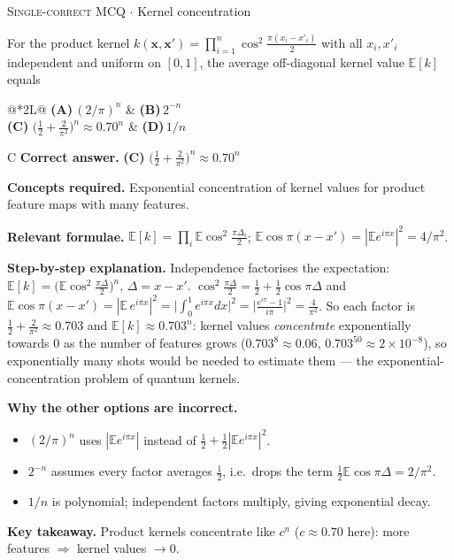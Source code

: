 \documentclass[11pt,a4paper]{article}
\newcommand{\optlabel}[1]{\textbf{(#1)}}
\newcommand{\correctlabel}[1]{\textcolor{okgreen}{\textbf{(#1)}\,\ding{51}}}
\newenvironment{qitem}[1]{\begin{list}{}{\setlength{\leftmargin}{3.3em}\setlength{\labelwidth}{3.1em}%
  \setlength{\labelsep}{0.2em}\setlength{\topsep}{3pt}\setlength{\parsep}{3pt}}\item[\textbf{Q.#1}\hfill]}{\end{list}}
\newcommand{\qsep}{\par\vspace{2pt}{\color{black!15}\hrule}\vspace{4pt}}
\newcommand{\qmeta}[2]{{\footnotesize\color{black!60}\textsc{#1} \;$\cdot$\; #2}\par}
\begin{document}
\begin{qitem}{70}
\qmeta{Single-correct MCQ}{Kernel concentration}
For the product kernel $k(\mathbf x, \mathbf x') = \prod_{i=1}^{n}\cos^2\frac{\pi(x_i - x'_i)}{2}$ with all $x_i, x'_i$ independent
and uniform on $[0, 1]$, the average off-diagonal kernel value $\mathbb E[k]$ equals
\par\smallskip\noindent\begin{tabularx}{\linewidth}{@{}*{2}{L}@{}}
\optlabel{A}\,$(2/\pi)^n$ & \optlabel{B}\,$2^{-n}$ \\[3pt]
\correctlabel{C}\,$\big(\tfrac12 + \tfrac{2}{\pi^2}\big)^n \approx 0.70^n$ & \optlabel{D}\,$1/n$
\end{tabularx}
\end{qitem}
\begin{solbox}{C}
\textbf{\color{brand}Correct answer.} \textcolor{okgreen}{\textbf{(C)}} $\big(\tfrac12 + \tfrac{2}{\pi^2}\big)^n \approx 0.70^n$

\textbf{\color{brand}Concepts required.} Exponential concentration of kernel values for product feature maps with many features.

\textbf{\color{brand}Relevant formulae.} $\mathbb E[k] = \prod_i\mathbb E\cos^2\frac{\pi\Delta_i}2$; $\mathbb E\cos\pi(x - x') = |\mathbb Ee^{i\pi x}|^2 = 4/\pi^2$.

\textbf{\color{brand}Step-by-step explanation.} Independence factorises the expectation: $\mathbb E[k] = \big(\mathbb E\cos^2\frac{\pi\Delta}{2}\big)^n$, $\Delta = x - x'$.
$\cos^2\frac{\pi\Delta}{2} = \frac12 + \frac12\cos\pi\Delta$ and $\mathbb E\cos\pi(x - x') = |\mathbb E\,e^{i\pi x}|^2 = \big|\int_0^1e^{i\pi x}dx\big|^2 = \big|\frac{e^{i\pi} - 1}{i\pi}\big|^2 = \frac{4}{\pi^2}$.
So each factor is $\frac12 + \frac{2}{\pi^2} \approx 0.703$ and $\mathbb E[k] \approx 0.703^n$: kernel values \emph{concentrate} exponentially
towards 0 as the number of features grows ($0.703^{8} \approx 0.06$, $0.703^{50} \approx 2\times10^{-8}$), so exponentially many shots would
be needed to estimate them --- the exponential-concentration problem of quantum kernels.

\textbf{\color{brand}Why the other options are incorrect.}
\begin{itemize}[leftmargin=2.4em, itemsep=1pt, topsep=2pt]
\item[\textbf{(A)}] $(2/\pi)^n$ uses $|\mathbb Ee^{i\pi x}|$ instead of $\frac12 + \frac12|\mathbb Ee^{i\pi x}|^2$.
\item[\textbf{(B)}] $2^{-n}$ assumes every factor averages $\frac12$, i.e.\ drops the term $\frac12\mathbb E\cos\pi\Delta = 2/\pi^2$.
\item[\textbf{(D)}] $1/n$ is polynomial; independent factors multiply, giving exponential decay.
\end{itemize}
\textbf{\color{brand}Key takeaway.} Product kernels concentrate like $c^n$ ($c \approx 0.70$ here): more features $\Rightarrow$ kernel values $\to 0$.
\end{solbox}
\qsep
\end{document}
